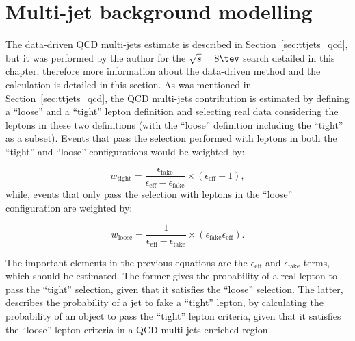 \section{Multi-jet background modelling}

The data-driven QCD multi-jets estimate is described in Section~\ref{sec:ttjets_qcd}, but it was performed by the author for the $\sqrt{s} = 8\tev$ search
detailed in this chapter, therefore more information about the data-driven method and the calculation is detailed in this section.
As was mentioned in Section~\ref{sec:ttjets_qcd}, the QCD multi-jets contribution is estimated by defining a ``loose'' and a ``tight'' lepton definition and selecting
real data considering the leptons in these two definitions (with the ``loose'' definition including the ``tight'' as a subset). Events that pass the selection
performed with leptons in both the ``tight'' and ``loose'' configurations would be weighted by:

\begin{equation}
\displaystyle
w_{\mathrm{tight}} = \frac{\epsilon_{\mathrm{fake}}}{\epsilon_{\mathrm{eff}} - \epsilon_{\mathrm{fake}}} \times ( \epsilon_{\mathrm{eff}} - 1 ),
\label{eq:mmqcd_wtight_ttres8}
\end{equation}
while, events that only pass the selection with leptons in the ``loose'' configuration are weighted by:

\begin{equation}
\displaystyle
w_{\mathrm{loose}} = \frac{1}{\epsilon_{\mathrm{eff}} - \epsilon_{\mathrm{fake}}} \times ( \epsilon_{\mathrm{fake}} \epsilon_{\mathrm{eff}} ).
\label{eq:mmqcd_wloose_ttres8}
\end{equation}

The important elements in the previous equations are the $\epsilon_{\mathrm{eff}}$ and $\epsilon_{\mathrm{fake}}$ terms, which should be estimated. The former
gives the probability of a real lepton to pass the ``tight'' selection, given that it satisfies the ``loose'' selection. The latter, describes the probability
of a jet to fake a ``tight'' lepton, by calculating the probability of an object to pass the ``tight'' lepton criteria, given that it satisfies the ``loose'' lepton criteria in
a QCD multi-jets-enriched region.

